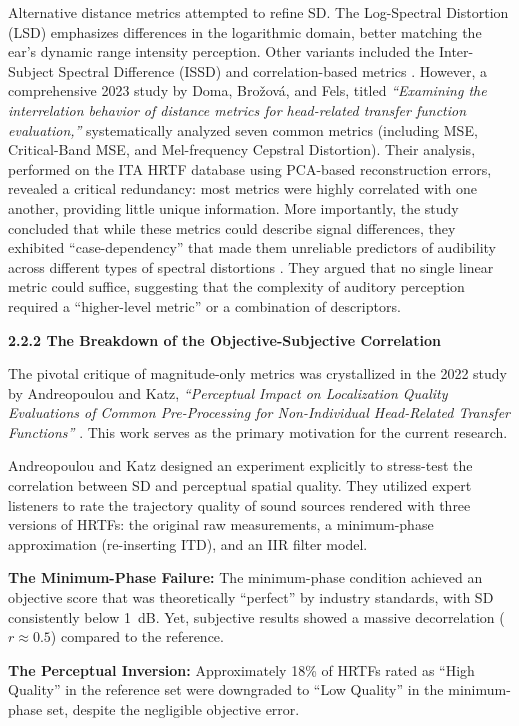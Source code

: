 \documentclass[12pt,a4paper]{article}
\begin{document}
Alternative distance metrics attempted to refine SD. The Log-Spectral Distortion (LSD) emphasizes differences in the logarithmic domain, better matching the ear's dynamic range intensity perception. Other variants included the Inter-Subject Spectral Difference (ISSD) and correlation-based metrics \cite{doma2023}. However, a comprehensive 2023 study by Doma, Bro\v{z}ov\'{a}, and Fels, titled \textit{``Examining the interrelation behavior of distance metrics for head-related transfer function evaluation,''} systematically analyzed seven common metrics (including MSE, Critical-Band MSE, and Mel-frequency Cepstral Distortion). Their analysis, performed on the ITA HRTF database using PCA-based reconstruction errors, revealed a critical redundancy: most metrics were highly correlated with one another, providing little unique information. More importantly, the study concluded that while these metrics could describe signal differences, they exhibited ``case-dependency'' that made them unreliable predictors of audibility across different types of spectral distortions \cite{doma2023}. They argued that no single linear metric could suffice, suggesting that the complexity of auditory perception required a ``higher-level metric'' or a combination of descriptors.

\textbf{2.2.2 The Breakdown of the Objective-Subjective Correlation}

The pivotal critique of magnitude-only metrics was crystallized in the 2022 study by Andreopoulou and Katz, \textit{``Perceptual Impact on Localization Quality Evaluations of Common Pre-Processing for Non-Individual Head-Related Transfer Functions''} \cite{andreopoulou2022}. This work serves as the primary motivation for the current research.

Andreopoulou and Katz designed an experiment explicitly to stress-test the correlation between SD and perceptual spatial quality. They utilized expert listeners to rate the trajectory quality of sound sources rendered with three versions of HRTFs: the original raw measurements, a minimum-phase approximation (re-inserting ITD), and an IIR filter model.

\textbf{The Minimum-Phase Failure:} The minimum-phase condition achieved an objective score that was theoretically ``perfect'' by industry standards, with SD consistently below 1~dB. Yet, subjective results showed a massive decorrelation ($r \approx 0.5$) compared to the reference.

\textbf{The Perceptual Inversion:} Approximately 18\% of HRTFs rated as ``High Quality'' in the reference set were downgraded to ``Low Quality'' in the minimum-phase set, despite the negligible objective error.
\end{document}
